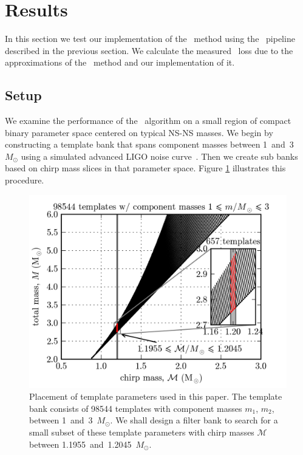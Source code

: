 \section{Results}
\label{SECIV}\label{sec:results}

In this section we test our implementation of the \lloid\ method using the \gstreamer\
pipeline described in the previous section.  We calculate the measured \SNR\
loss due to the approximations of the \lloid\ method and our implementation of
it.

\subsection{Setup}

We examine the performance of the \lloid\ algorithm on a small region of
compact binary parameter space centered on typical NS-NS masses.  We begin by
constructing a template bank that spans component masses between
1~and~3~$M_\odot$ using a simulated advanced LIGO noise curve~\cite{lal}.  Then
we create sub banks based on chirp mass slices in that parameter space.
Figure \ref{fig:tmpltbank} illustrates this procedure.
\begin{figure}[htbp]
	\begin{center}
		\includegraphics{figures/tmpltbank.png}
		\caption{\label{fig:tmpltbank}Placement of template parameters used in this paper.  The template bank consists of 98544 templates with component masses $m_1$, $m_2$, between 1~and~3~$M_\odot$.  We shall design a filter bank to search for a small subset of these template parameters with chirp masses $\mathcal M$ between 1.1955~and~1.2045~$M_\odot$.}
	\end{center}
\end{figure}
